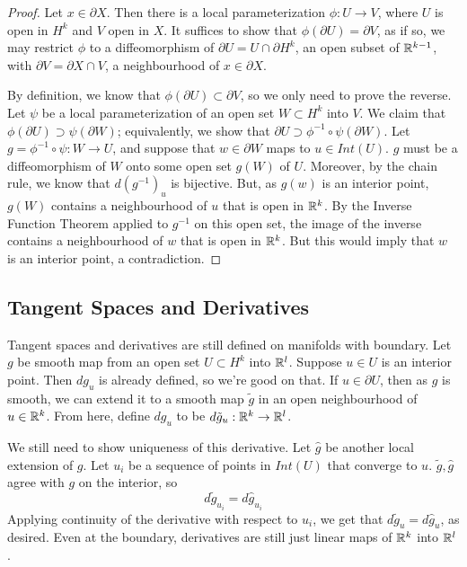 \begin{proof}
    Let $x \in \partial X$. Then there is a local parameterization $\phi: U \to V$, where $U$ is open in $H^k$ and $V$ open in $X$. It suffices to show that $\phi(\partial U) = \partial V$, as if so, we may restrict $\phi$ to a diffeomorphism of $\partial U = U \cap \partial H^k$, an open subset of $\mathbb{R}^{k-1}$, with $\partial V = \partial X \cap V$, a neighbourhood of $x \in \partial X$. 

    By definition, we know that $\phi(\partial U) \subset \partial V$, so we only need to prove the reverse. Let $\psi$ be a local parameterization of an open set $W \subset H^k$ into $V$. We claim that $\phi(\partial U) \supset \psi(\partial W)$; equivalently, we show that $\partial U \supset \phi^{-1} \circ \psi(\partial W)$. Let $g = \phi^{-1} \circ \psi: W \to U$, and suppose that $w \in \partial W$ maps to $u \in Int(U)$. $g$ must be a diffeomorphism of $W$ onto some open set $g(W)$ of $U$. Moreover, by the chain rule, we know that $d(g^{-1})_u$ is bijective. But, as $g(w)$ is an interior point, $g(W)$ contains a neighbourhood of $u$ that is open in $\mathbb{R}^k$. By the Inverse Function Theorem applied to $g^{-1}$ on this open set, the image of the inverse contains a neighbourhood of $w$ that is open in $\mathbb{R}^k$. But this would imply that $w$ is an interior point, a contradiction. 
\end{proof}

\subsection{Tangent Spaces and Derivatives}

Tangent spaces and derivatives are still defined on manifolds with boundary. Let $g$ be smooth map from an open set $U \subset H^k$ into $\mathbb{R}^l$. Suppose $u \in U$ is an interior point. Then $dg_u$ is already defined, so we're good on that. If $u \in \partial U$, then as $g$ is smooth, we can extend it to a smooth map $\tilde{g}$ in an open neighbourhood of $u \in \mathbb{R}^k$. From here, define $dg_u$ to be $d\tilde{g}_u: \mathbb{R}^k \to \mathbb{R}^l$. 

We still need to show uniqueness of this derivative. Let $\hat{g}$ be another local extension of $g$. Let $u_i$ be a sequence of points in $Int(U)$ that converge to $u$. $\tilde{g},\hat{g}$ agree with $g$ on the interior, so 
\[d\tilde{g}_{u_i} = d\hat{g}_{u_i}\]
Applying continuity of the derivative with respect to $u_i$, we get that $d\tilde{g}_u = d\hat{g}_u$, as desired. Even at the boundary, derivatives are still just linear maps of $\mathbb{R}^k$ into $\mathbb{R}^l$. 

